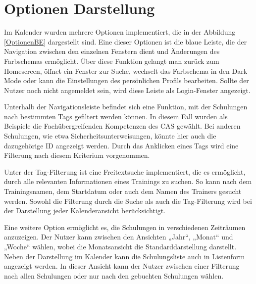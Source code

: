 \section{Optionen Darstellung}

Im Kalender wurden mehrere Optionen implementiert, die in der Abbildung \ref{OptionenBE} dargestellt sind. Eine dieser Optionen ist
die blaue Leiste, die der Navigation zwischen den einzelnen Fenstern dient und Änderungen des Farbschemas ermöglicht. Über diese
Funktion gelangt man zurück zum Homescreen, öffnet ein Fenster zur Suche, wechselt das Farbschema in den Dark Mode oder kann die
Einstellungen des persönlichen Profils bearbeiten. Sollte der Nutzer noch nicht angemeldet sein, wird diese Leiste als
Login-Fenster angezeigt. \newline

Unterhalb der Navigationsleiste befindet sich eine Funktion, mit der Schulungen nach bestimmten Tags gefiltert werden können. In
diesem Fall wurden als Beispiele die Fachübergreifenden Kompetenzen des CAS gewählt. Bei anderen Schulungen, wie etwa
Sicherheitsunterweisungen, könnte hier auch die dazugehörige ID angezeigt werden. Durch das Anklicken eines Tags wird eine
Filterung nach diesem Kriterium vorgenommen. \newline

Unter der Tag-Filterung ist eine Freitextsuche implementiert, die es ermöglicht, durch alle relevanten Informationen eines 
Trainings zu suchen. So kann nach dem Trainingsnamen, dem Startdatum oder auch dem Namen des Trainers gesucht werden. Sowohl
die Filterung durch die Suche als auch die Tag-Filterung wird bei der Darstellung jeder Kalenderansicht berücksichtigt.\newline

Eine weitere Option ermöglicht es, die Schulungen in verschiedenen Zeiträumen anzuzeigen. Der Nutzer kann zwischen den Ansichten 
„Jahr“, „Monat“ und „Woche“ wählen, wobei die Monatsansicht die Standarddarstellung darstellt. Neben der Darstellung im Kalender
kann die Schulungsliste auch in Listenform angezeigt werden. In dieser Ansicht kann der Nutzer zwischen einer Filterung nach allen
Schulungen oder nur nach den gebuchten Schulungen wählen.\newline

